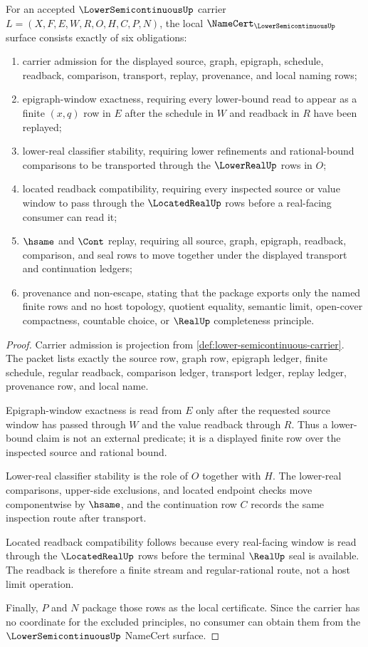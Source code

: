\begin{theorem}
\label{thm:lower-semicontinuous-namecert-obligation-surface}
For an accepted $\LowerSemicontinuousUp$ carrier
$L=(X,F,E,W,R,O,H,C,P,N)$, the local
$\NameCert_{\LowerSemicontinuousUp}$ surface consists exactly of six
obligations:
\begin{enumerate}
\item carrier admission for the displayed source, graph, epigraph, schedule,
  readback, comparison, transport, replay, provenance, and local naming rows;
\item epigraph-window exactness, requiring every lower-bound read to appear
  as a finite $(x,q)$ row in $E$ after the schedule in $W$ and readback in
  $R$ have been replayed;
\item lower-real classifier stability, requiring lower refinements and
  rational-bound comparisons to be transported through the $\LowerRealUp$
  rows in $O$;
\item located readback compatibility, requiring every inspected source or
  value window to pass through the $\LocatedRealUp$ rows before a real-facing
  consumer can read it;
\item $\hsame$ and $\Cont$ replay, requiring all source, graph, epigraph,
  readback, comparison, and seal rows to move together under the displayed
  transport and continuation ledgers;
\item provenance and non-escape, stating that the package exports only the
  named finite rows and no host topology, quotient equality, semantic limit,
  open-cover compactness, countable choice, or $\RealUp$ completeness
  principle.
\end{enumerate}
\end{theorem}
\begin{proof}
Carrier admission is projection from
\autoref{def:lower-semicontinuous-carrier}. The packet lists exactly the
source row, graph row, epigraph ledger, finite schedule, regular readback,
comparison ledger, transport ledger, replay ledger, provenance row, and local
name.

Epigraph-window exactness is read from $E$ only after the requested source
window has passed through $W$ and the value readback through $R$. Thus a
lower-bound claim is not an external predicate; it is a displayed finite row
over the inspected source and rational bound.

Lower-real classifier stability is the role of $O$ together with $H$. The
lower-real comparisons, upper-side exclusions, and located endpoint checks
move componentwise by $\hsame$, and the continuation row $C$ records the same
inspection route after transport.

Located readback compatibility follows because every real-facing window is
read through the $\LocatedRealUp$ rows before the terminal $\RealUp$ seal is
available. The readback is therefore a finite stream and regular-rational
route, not a host limit operation.

Finally, $P$ and $N$ package those rows as the local certificate. Since the
carrier has no coordinate for the excluded principles, no consumer can obtain
them from the $\LowerSemicontinuousUp$ NameCert surface.
\end{proof}
